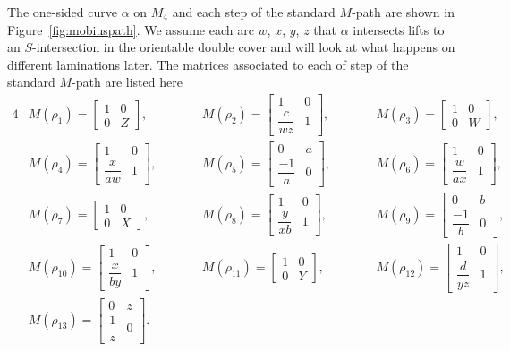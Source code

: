 \documentclass[pdftex]{sigma}
\numberwithin{equation}{section}
\theoremstyle{definition}
\begin{document}
The one-sided curve $\alpha$ on $M_4$ and each step of the
standard $M$-path are shown in Figure~\ref{fig:mobiuspath}. We assume each arc $w$, $x$, $y$, $z$ that $\alpha$ intersects lifts to an $S$-intersection in the orientable double cover and will look at what happens on different laminations later. The matrices associated to each of step of the standard $M$-path are listed here
\begin{alignat*}{4}
& M( \rho _{1}) = \begin{bmatrix}
1 & 0\\
0 & Z
\end{bmatrix} ,\qquad&& M( \rho _{2}) = \begin{bmatrix}
1 & 0\\
\dfrac{c}{wz} & 1
\end{bmatrix} ,\qquad &&M( \rho _{3}) = \begin{bmatrix}
1 & 0\\
0 & W
\end{bmatrix} ,&\\ &M( \rho _{4}) = \begin{bmatrix}
1 & 0\\
\dfrac{x}{aw} & 1
\end{bmatrix} ,
\qquad&&
M( \rho _{5}) = \begin{bmatrix}
0 & a\\
\dfrac{-1}{a} & 0
\end{bmatrix} ,\qquad&& M( \rho _{6}) = \begin{bmatrix}
1 & 0\\
\dfrac{w}{ax} & 1
\end{bmatrix} ,&\\ &M( \rho _{7}) = \begin{bmatrix}
1 & 0\\
0 & X
\end{bmatrix} ,\qquad&& M( \rho _{8}) = \begin{bmatrix}
1 & 0\\
\dfrac{y}{xb} & 1
\end{bmatrix} ,
\qquad&&
M( \rho _{9}) = \begin{bmatrix}
0 & b\\
\dfrac{-1}{b} & 0
\end{bmatrix} ,&\\ &M( \rho _{10}) = \begin{bmatrix}
1 & 0\\
\dfrac{x}{by} & 1
\end{bmatrix} ,\qquad&& M( \rho _{11}) = \begin{bmatrix}
1 & 0\\
0 & Y
\end{bmatrix} ,\qquad&& M( \rho _{12}) = \begin{bmatrix}
1 & 0\\
\dfrac{d}{yz} & 1
\end{bmatrix} ,&
\\
 &M( \rho _{13}) = \begin{bmatrix}
0 & z\\
\dfrac{1}{z} & 0
\end{bmatrix}.&&&&&
\end{alignat*}
\end{document}
